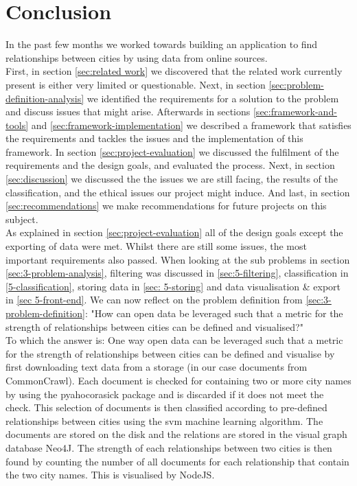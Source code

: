 \chapter{Conclusion}
In the past few months we worked towards building an application to find relationships between cities by using data from online sources.  \\

First, in section \ref{sec:related work} we discovered that the related work currently present is either very limited or questionable. Next, in section \ref{sec:problem-definition-analysis} we identified the requirements for a solution to the problem and discuss issues that might arise. Afterwards in sections \ref{sec:framework-and-tools} and \ref{sec:framework-implementation} we described a framework that satisfies the requirements and tackles the issues and the implementation of this framework. In section \ref{sec:project-evaluation} we discussed the fulfilment of the requirements and the design goals, and evaluated the process. Next, in section \ref{sec:discussion} we discussed the the issues we are still facing, the results of the classification, and the ethical issues our project might induce. And last, in section \ref{sec:recommendations} we make recommendations for future projects on this subject. \\

As explained in section \ref{sec:project-evaluation} all of the design goals except the exporting of data were met. Whilst there are still some issues, the most important requirements also passed. When looking at the sub problems in section \ref{sec:3-problem-analysis}, filtering was discussed in \ref{sec:5-filtering}, classification in \ref{5-classification}, storing data in \ref{sec: 5-storing} and data visualisation \& export in \ref{sec 5-front-end}. We can now reflect on the problem definition from \ref{sec:3-problem-definition}: "How can open data be leveraged such that a metric for the strength of relationships between cities can be defined and visualised?" \\

To which the answer is: One way open data can be leveraged such that a metric for the strength of relationships between cities can be defined and visualise by first downloading text data from a storage (in our case documents from CommonCrawl). Each document is checked for containing two or more city names by using the pyahocorasick package and is discarded if it does not meet the check. This selection of documents is then classified according to pre-defined relationships between cities using the svm machine learning algorithm. The documents are stored on the disk and the relations are stored in the visual graph database Neo4J. The strength of each relationships between two cities is then found by counting the number of all documents for each relationship that contain the two city names. This is visualised by NodeJS. \\



